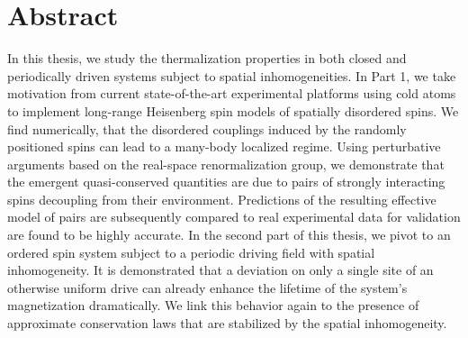\begingroup
\let\clearpage\relax
\let\cleardoublepage\relax
\let\cleardoublepage\relax

\chapter*{Abstract}
%
%

In this thesis, we study the thermalization properties in both closed and periodically driven systems subject to spatial inhomogeneities. 
In Part 1, we take motivation from current state-of-the-art experimental platforms using cold atoms to implement long-range Heisenberg spin models of spatially disordered spins. We find numerically, that the disordered couplings induced by the randomly positioned spins can lead to a many-body localized regime. Using perturbative arguments based on the real-space renormalization group, we demonstrate that the emergent quasi-conserved quantities are due to pairs of strongly interacting spins decoupling from their environment. Predictions of the resulting effective model of pairs are subsequently compared to real experimental data for validation are found to be highly accurate.
In the second part of this thesis, we pivot to an ordered spin system subject to a periodic driving field with spatial inhomogeneity. It is demonstrated that a deviation on only a single site of an otherwise uniform drive can already enhance the lifetime of the system's magnetization dramatically. We link this behavior again to the presence of approximate conservation laws that are stabilized by the spatial inhomogeneity.


